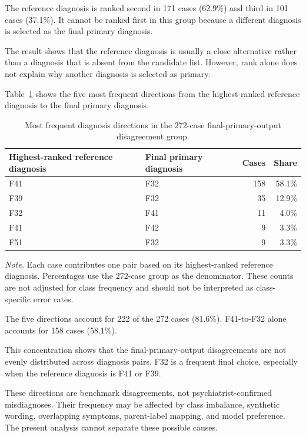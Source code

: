 \documentclass[12pt,a4paper,oneside]{report}
\begin{document}
The reference diagnosis is ranked second in 171 cases (62.9\%) and third
in 101 cases (37.1\%). It cannot be ranked first in this group because a
different diagnosis is selected as the final primary diagnosis.

The result shows that the reference diagnosis is usually a close
alternative rather than a diagnosis that is absent from the candidate
list. However, rank alone does not explain why another diagnosis is
selected as primary.

Table~\ref{tab:ch8-selection-pairs} shows the five most frequent
directions from the highest-ranked reference diagnosis to the final
primary diagnosis.

\begin{table}[htbp]
\centering
\caption{Most frequent diagnosis directions in the 272-case
final-primary-output disagreement group.}
\label{tab:ch8-selection-pairs}
\small
\renewcommand{\arraystretch}{1.12}
\begin{tabularx}{\textwidth}
{|>{\raggedright\arraybackslash}X|
 >{\raggedright\arraybackslash}p{3.2cm}|
 r|r|}
\hline
\textbf{Highest-ranked reference diagnosis} &
\textbf{Final primary diagnosis} &
\textbf{Cases} &
\textbf{Share}\\
\hline
F41 & F32 & 158 & 58.1\%\\
\hline
F39 & F32 & 35 & 12.9\%\\
\hline
F32 & F41 & 11 & 4.0\%\\
\hline
F41 & F42 & 9 & 3.3\%\\
\hline
F51 & F32 & 9 & 3.3\%\\
\hline
\end{tabularx}
\renewcommand{\arraystretch}{1.0}

\parbox{0.96\textwidth}{\footnotesize
\textit{Note.} Each case contributes one pair based on its
highest-ranked reference diagnosis. Percentages use the 272-case group
as the denominator. These counts are not adjusted for class frequency
and should not be interpreted as class-specific error rates.
}
\end{table}

The five directions account for 222 of the 272 cases (81.6\%).
F41-to-F32 alone accounts for 158 cases (58.1\%).

This concentration shows that the final-primary-output disagreements are
not evenly distributed across diagnosis pairs. F32 is a frequent final
choice, especially when the reference diagnosis is F41 or F39.

These directions are benchmark disagreements, not
psychiatrist-confirmed misdiagnoses. Their frequency may be affected by
class imbalance, synthetic wording, overlapping symptoms, parent-label
mapping, and model preference. The present analysis cannot separate
these possible causes.
\end{document}
